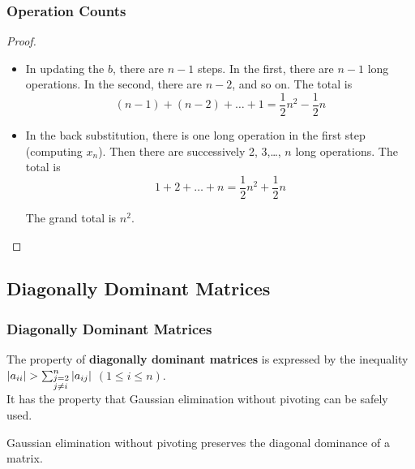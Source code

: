 \documentclass[notheorems,mathserif,table,compress]{beamer}  %
\begin{document}
\begin{frame}
\frametitle{Operation Counts} 
\begin{proof}
\begin{itemize}
\item In updating the $b$, there are $n-1$ steps. In the first, there are $n-1$ long operations. In the second, there are $n-2$, and so on. The total is
\begin{displaymath}
(n-1)+(n-2)+\ldots+1=\frac{1}{2}n^2-\frac{1}{2}n
\end{displaymath}

\item In the back substitution, there is one long operation in the first step (computing $x_n$). Then there are successively 2, 3,\ldots, $n$ long operations. The total is 
\begin{displaymath}
1+2+\ldots+n=\frac{1}{2}n^2+\frac{1}{2}n
\end{displaymath}

The grand total is $n^2$.
\end{itemize}
\end{proof}
\end{frame}

\subsection{Diagonally Dominant Matrices}

\begin{frame}
\frametitle{Diagonally Dominant Matrices}
The property of \textbf{diagonally dominant matrices} is expressed by the inequality $|a_{ii}|>\sum_{\begin{subarray}{l}
{j=2}\\
j\neq i
\end{subarray}}^n|a_{ij}|$ \qquad $(1\leq i\leq n)$.\\
It has the property that Gaussian elimination without pivoting can be safely used.
\begin{theorem}
Gaussian elimination without pivoting preserves the diagonal dominance of a matrix.
\end{theorem}

\end{frame}
\end{document}
